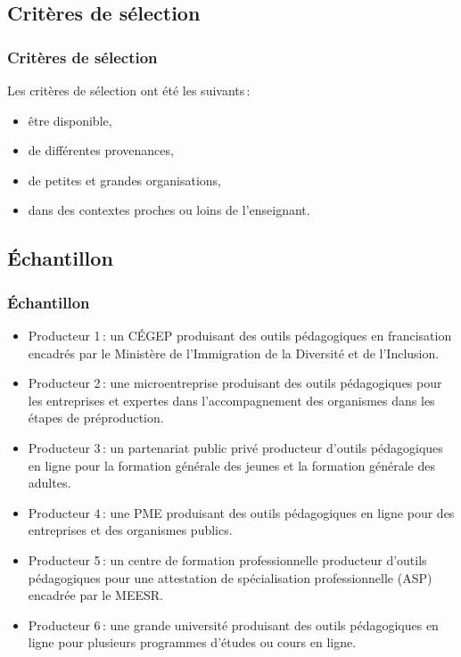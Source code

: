 				\subsection{Critères de sélection} 
					\begin{frame}[allowframebreaks]
						\frametitle{Critères de sélection}
                        			Les critères de sélection ont été les suivants\,:
                        			\begin{itemize} 
                       				\item être disponible,
							\item de différentes provenances, 
							\item de petites et grandes organisations, 
							\item dans des contextes proches ou loins de l'enseignant.
                       		 \end{itemize}
                       		 \end{frame}
                       		 \subsection{Échantillon} 
					\begin{frame}[allowframebreaks]
						\frametitle{Échantillon}
                        
                        			\begin{itemize} 
                       				\item Producteur 1\,: un CÉGEP produisant des outils pédagogiques en francisation encadrés par le Ministère de l’Immigration de la Diversité et de l'Inclusion.
                       				\item Producteur 2\,: une microentreprise produisant des outils pédagogiques pour les entreprises et expertes dans l’accompagnement des organismes dans les étapes de préproduction.
							\item Producteur 3\,: un partenariat public privé producteur d’outils pédagogiques en ligne pour la formation générale des jeunes et la formation générale des adultes.
							\item Producteur 4\,: une PME produisant des outils pédagogiques en ligne pour des entreprises et des organismes publics.
							\item Producteur 5\,: un centre de formation professionnelle producteur d’outils pédagogiques pour une attestation de spécialisation professionnelle (ASP) encadrée par le MEESR.
							\item Producteur 6\,: une grande université produisant des outils pédagogiques en ligne pour plusieurs programmes d’études ou cours en ligne.

                       		 \end{itemize}
                       		           
                \end{frame}
                       		 
